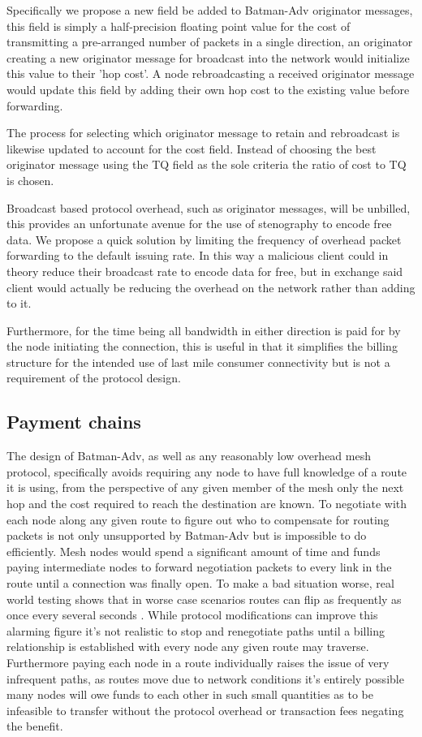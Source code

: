\documentclass[11pt]{article}
\begin{document}
		Specifically we propose a new field be added to Batman-Adv originator messages, this field is simply a half-precision floating point value for the cost of transmitting a pre-arranged number of packets in a single direction, an originator creating a new originator message for broadcast into the network would initialize this value to their 'hop cost'. A node rebroadcasting a received originator message would update this field by adding their own hop cost to the existing value before forwarding.

	        The process for selecting which originator message to retain and rebroadcast is likewise updated to account for the cost field. Instead of choosing the best originator message using the TQ field as the sole criteria the ratio of cost to TQ is chosen.

                Broadcast based protocol overhead, such as originator messages, will be unbilled, this provides an unfortunate avenue for the use of stenography to encode free data. We propose a quick solution by limiting the frequency of overhead packet forwarding to the default issuing rate. In this way a malicious client could in theory reduce their broadcast rate to encode data for free, but in exchange said client would actually be reducing the overhead on the network rather than adding to it.

                Furthermore, for the time being all bandwidth in either direction is paid for by the node initiating the connection, this is useful in that it simplifies the billing structure for the intended use of last mile consumer connectivity but is not a requirement of the protocol design.

	\subsection{Payment chains} \label{paychains}

               The design of Batman-Adv, as well as any reasonably low overhead mesh protocol, specifically avoids requiring any node to have full knowledge of a route it is using, from the perspective of any given member of the mesh only the next hop and the cost required to reach the destination are known. To negotiate with each node along any given route to figure out who to compensate for routing packets is not only unsupported by Batman-Adv but is impossible to do efficiently. Mesh nodes would spend a significant amount of time and funds paying intermediate nodes to forward negotiation packets to every link in the route until a connection was finally open. To make a bad situation worse, real world testing shows that in worse case scenarios routes can flip as frequently as once every several seconds \cite{meshflip}. While protocol modifications can improve this alarming figure it's not realistic to stop and renegotiate paths until a billing relationship is established with every node any given route may traverse. Furthermore paying each node in a route individually raises the issue of very infrequent paths, as routes move due to network conditions it's entirely possible many nodes will owe funds to each other in such small quantities as to be infeasible to transfer without the protocol overhead or transaction fees negating the benefit.
               
\end{document}
